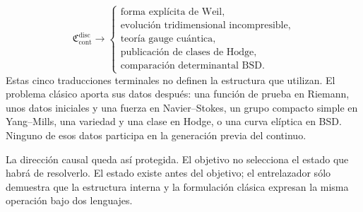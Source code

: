 \[
\mathfrak C_{\mathrm{cont}}^{\mathrm{disc}}
\longrightarrow
\begin{cases}
\text{forma explícita de Weil},\\
\text{evolución tridimensional incompresible},\\
\text{teoría gauge cuántica},\\
\text{publicación de clases de Hodge},\\
\text{comparación determinantal BSD}.
\end{cases}
\]
Estas cinco traducciones terminales no definen la estructura que utilizan. El problema clásico aporta sus datos después: una función de prueba en Riemann, unos datos iniciales y una fuerza en Navier–Stokes, un grupo compacto simple en Yang–Mills, una variedad y una clase en Hodge, o una curva elíptica en BSD. Ninguno de esos datos participa en la generación previa del continuo.\par
La dirección causal queda así protegida. El objetivo no selecciona el estado que habrá de resolverlo. El estado existe antes del objetivo; el entrelazador sólo demuestra que la estructura interna y la formulación clásica expresan la misma operación bajo dos lenguajes.\par
{}
